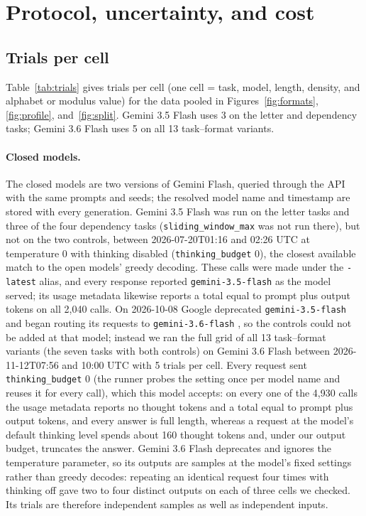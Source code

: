 \documentclass[10pt]{article} %
\newcommand{\task}[1]{\texttt{#1}}
\begin{document}


\FloatBarrier
\section{Protocol, uncertainty, and cost}

\subsection{Trials per cell}
\label{app:trials}

Table~\ref{tab:trials} gives trials per cell (one cell = task, model, length, density, and alphabet or modulus value) for the data pooled in Figures~\ref{fig:formats}, \ref{fig:profile}, and~\ref{fig:split}. Gemini 3.5 Flash uses 3 on the letter and dependency tasks; Gemini 3.6 Flash uses 5 on all 13 task--format variants.

\paragraph{Closed models.} The closed models are two versions of Gemini Flash, queried through the API with the same prompts and seeds; the resolved model name and timestamp are stored with every generation. Gemini 3.5 Flash \citep{gemini35flash} was run on the letter tasks and three of the four dependency tasks (\task{sliding\_window\_max} was not run there), but not on the two controls, between 2026-07-20T01:16 and 02:26 UTC at temperature 0 with thinking disabled (\texttt{thinking\_budget} 0), the closest available match to the open models' greedy decoding. These calls were made under the \texttt{-latest} alias, and every response reported \texttt{gemini-3.5-flash} as the model served; its usage metadata likewise reports a total equal to prompt plus output tokens on all 2,040 calls. On 2026-10-08 Google deprecated \texttt{gemini-3.5-flash} and began routing its requests to \texttt{gemini-3.6-flash} \citep{geminichangelog}, so the controls could not be added at that model; instead we ran the full grid of all 13 task--format variants (the seven tasks with both controls) on Gemini 3.6 Flash \citep{gemini36flash} between 2026-11-12T07:56 and 10:00 UTC with 5 trials per cell. Every request sent \texttt{thinking\_budget} 0 (the runner probes the setting once per model name and reuses it for every call), which this model accepts: on every one of the 4,930 calls the usage metadata reports no thought tokens and a total equal to prompt plus output tokens, and every answer is full length, whereas a request at the model's default thinking level spends about 160 thought tokens and, under our output budget, truncates the answer. Gemini 3.6 Flash deprecates and ignores the temperature parameter, so its outputs are samples at the model's fixed settings rather than greedy decodes: repeating an identical request four times with thinking off gave two to four distinct outputs on each of three cells we checked. Its trials are therefore independent samples as well as independent inputs.
\end{document}

